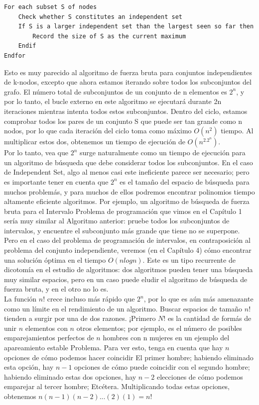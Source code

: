 \documentclass[a4paper]{article}
\begin{document}
\begin{lstlisting}
For each subset S of nodes
	Check whether S constitutes an independent set
	If S is a larger independent set than the largest seen so far then
		Record the size of S as the current maximum
	Endif
Endfor
\end{lstlisting}

Esto es muy parecido al algoritmo de fuerza bruta para conjuntos independientes de k-nodos, excepto que ahora estamos iterando sobre todos los subconjuntos del grafo. El número total de subconjuntos de un conjunto de n elementos es $2^n$, y por lo tanto, el bucle externo en este algoritmo se ejecutará durante 2n iteraciones mientras intenta todos estos subconjuntos. Dentro del ciclo, estamos comprobar todos los pares de un conjunto S que puede ser tan grande como n nodos, por lo que cada iteración del
ciclo toma como máximo $O(n^2)$ tiempo. Al multiplicar estos dos, obtenemos un tiempo de ejecución de $O(n^2.2^n)$.\\

Por lo tanto, vea que $2^n$ surge naturalmente como un tiempo de ejecución para un algoritmo de búsqueda que debe considerar todos los subconjuntos. En el caso de Independent Set, algo al menos casi este ineficiente parece ser necesario; pero es importante tener en cuenta que $2^n$ es el tamaño del espacio de búsqueda para muchos problemás, y para muchos de ellos podremos encontrar polinomios tiempo altamente eficiente algoritmos. Por ejemplo, un algoritmo de búsqueda de fuerza bruta para el
Intervalo Problema de programación que vimos en el Capítulo 1 sería muy similar al Algoritmo anterior: pruebe todos los subconjuntos de intervalos, y encuentre el subconjunto más grande que tiene no se superpone. Pero en el caso del problema de programación de intervalos, en contraposición al problema del conjunto independiente, veremos (en el Capítulo 4) cómo encontrar una solución óptima en el tiempo $O(n log n)$. Este es un tipo recurrente de dicotomía en el estudio de algoritmos: dos algoritmos pueden tener una búsqueda muy similar espacios, pero en un caso puede eludir el algoritmo de búsqueda de fuerza bruta, y en el otro no lo es.\\

La función $n!$ crece incluso más rápido que $2^n$, por lo que es aún más amenazante como un límite en el rendimiento de un algoritmo. Buscar espacios de tamaño $n!$ tienden a surgir por una de dos razones. ¡Primero $N$! es la cantidad de formás de unir $n$ elementos con $n$ otros elementos; por ejemplo, es el número de posibles emparejamientos perfectos de $n$ hombres con n mujeres en un ejemplo del apareamiento estable Problema. Para ver esto, tenga en cuenta que hay $n$ opciones de cómo podemos hacer coincidir El primer hombre; habiendo eliminado esta opción, hay $n-1$ opciones de cómo puede coincidir con el segundo hombre; habiendo eliminado estas dos opciones, hay $n-2$ elecciones de cómo podemos emparejar al tercer hombre; Etcétera. Multiplicando todas estas opciones, obtenemos $n(n-1)(n-2)...(2)(1)=n!$\\
\end{document}
